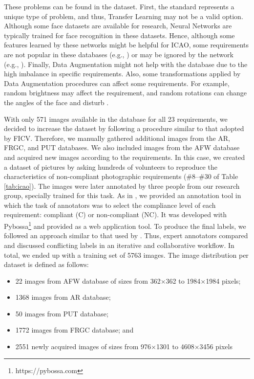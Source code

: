 These problems can be found in the \ficvtest dataset. First, the \icao standard represents a unique type of problem, and thus, Transfer Learning may not be a valid option. Although some face datasets are available for research, Neural Networks are typically trained for face recognition in these datasets. Hence, although some features learned by these networks might be helpful for ICAO, some requirements are not popular in these databases (e.g., \inkmarked) or may be ignored by the network (e.g., \variedbackground). Finally, Data Augmentation might not help with the \ficvtest database due to the high imbalance in specific requirements. Also, some transformations applied by Data Augmentation procedures can affect some requirements. For example, random brightness may affect the \toodarklight requirement, and random rotations can change the angles of the face and disturb \rollpitchyaw.
 
With only 571 images available in the \ficvtest database for all 23 requirements, we decided to increase the dataset by following a procedure similar to that adopted by FICV. Therefore, we manually gathered additional images from the AR, FRGC, and PUT databases. We also included images from the AFW database \citep{databaseAFW} and acquired new images according to the \icao requirements. In this case, we created a dataset of pictures by asking hundreds of volunteers to reproduce the characteristics of non-compliant photographic requirements (\#8--\#30 of Table \ref{tab:icao}). The images were later annotated by three people from our research group, specially trained for this task. As in \citep{Nowak2010}, we provided an annotation tool in which the task of annotators was to select the compliance level of each requirement: compliant (C) or non-compliant (NC). It was developed with Pybossa\footnote{https://pybossa.com} and provided as a web application tool. To produce the final labels, we followed an approach similar to that used by \citep{Chang2017}. Thus, expert annotators compared and discussed conflicting labels in an iterative and collaborative workflow. In total, we ended up with a training set of 5763 images. The image distribution per dataset is defined as follows:
 
\begin{itemize}
\item 22 images from AFW database of sizes from 362$\times$362 to 1984$\times$1984 pixels;
\item 1368 images from AR database;
\item 50 images from PUT database;
\item 1772 images from FRGC database; and
\item 2551 newly acquired images of sizes from 976$\times$1301 to 4608$\times$3456 pixels
\end{itemize}
 
